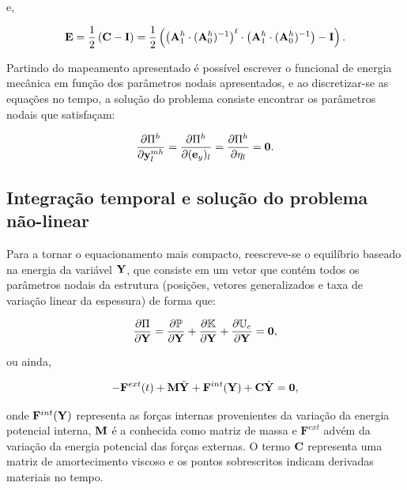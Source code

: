 \noindent e,

\begin{align}
	\mathbf{E} = \frac{1}{2}\left(\mathbf{C} - \mathbf{I}\right) = \frac{1}{2}\left(\left(\mathbf{A}^{h}_{1} \cdot (\mathbf{A}^{h}_{0})^{-1}\right)^{t} \cdot \left(\mathbf{A}^{h}_{1} \cdot (\mathbf{A}^{h}_{0})^{-1}\right) - \mathbf{I}\right).
\end{align}


Partindo do mapeamento apresentado é possível escrever o funcional de energia mecânica em função dos parâmetros nodais apresentados, e ao discretizar-se as equações no tempo, a solução do problema consiste encontrar os parâmetros nodais que satisfaçam:

\begin{align}
	\frac{\partial\Pi^{h}}{\partial \mathbf{y}_{l}^{mh}} = \frac{\partial\Pi^{h}}{\partial (\mathbf{e}_y)_l} = \frac{\partial\Pi^{h}}{\partial \eta_l} = \mathbf{0}.
\end{align}

\subsection{Integração temporal e solução do problema não-linear}

Para a tornar o equacionamento mais compacto, reescreve-se o equilíbrio baseado na energia da variável $\mathbf{Y}$, que consiste em um vetor que contém todos os parâmetros nodais da estrutura (posições, vetores generalizados e taxa de variação linear da espessura) de forma que:

\begin{align}
	\frac{\partial\Pi}{\partial\mathbf{Y}} = \frac{\partial\mathbb{P}}{\partial \mathbf{Y}} + \frac{\partial\mathbb{K}}{\partial \mathbf{Y}} + \frac{\partial\mathbb{U}_e}{\partial \mathbf{Y}} = \mathbf{0},
\end{align}

\noindent ou ainda,

\begin{align}
	- \mathbf{F}^{ext}(t) + \mathbf{M}\ddot{\mathbf{Y}}_{}+ \mathbf{F}^{int}(\mathbf{Y}) + \mathbf{C}\dot{\mathbf{Y}}_{} = \mathbf{0}, \label{eq:equi_forma_matricial}
\end{align}

\noindent onde $ \mathbf{F}^{int}(\mathbf{Y})$ representa as forças internas provenientes da variação da energia potencial interna, $\mathbf{M}$ é a conhecida como matriz de massa e $\mathbf{F}^{ext}$ advém da variação da energia potencial das forças externas. O termo $\mathbf{C}$ representa uma matriz de amortecimento viscoso e os pontos sobrescritos indicam derivadas materiais no tempo.

